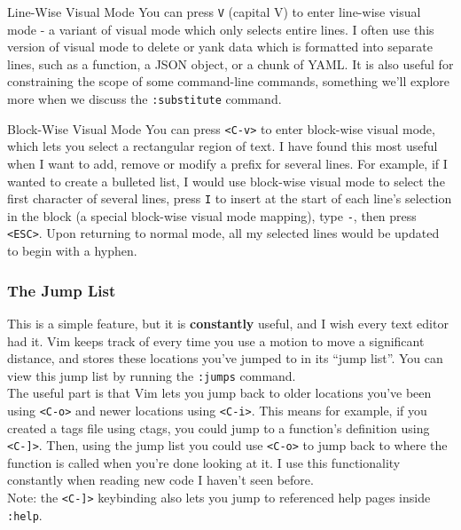 \documentclass{beamer}
\begin{document}
\begin{frame}[fragile]
    \begin{block}{Line-Wise Visual Mode}
	You can press \verb+V+ (capital V) to enter line-wise visual mode - a variant of visual mode which only selects entire lines. I often use this version of visual mode to delete or yank data which is formatted into separate lines, such as a function, a JSON object, or a chunk of YAML. It is also useful for constraining the scope of some command-line commands, something we'll explore more when we discuss the \verb+:substitute+ command.
    \end{block}
    \begin{block}{Block-Wise Visual Mode}
	You can press \verb+<C-v>+ to enter block-wise visual mode, which lets you select a rectangular region of text. I have found this most useful when I want to add, remove or modify a prefix for several lines. For example, if I wanted to create a bulleted list, I would use block-wise visual mode to select the first character of several lines, press \verb+I+ to insert at the start of each line's selection in the block (a special block-wise visual mode mapping), type \verb+-+, then press \verb+<ESC>+. Upon returning to normal mode, all my selected lines would be updated to begin with a hyphen.
    \end{block}
\end{frame}

\begin{frame}[fragile]
    \frametitle{The Jump List}
    This is a simple feature, but it is \textbf{constantly} useful, and I wish every text editor had it. Vim keeps track of every time you use a motion to move a significant distance, and stores these locations you've jumped to in its \enquote{jump list}. You can view this jump list by running the \verb+:jumps+ command.\\
    \vspace{0.5cm}
    The useful part is that Vim lets you jump back to older locations you've been using \verb+<C-o>+ and newer locations using \verb+<C-i>+. This means for example, if you created a tags file using ctags, you could jump to a function's definition using \verb+<C-]>+. Then, using the jump list you could use \verb+<C-o>+ to jump back to where the function is called when you're done looking at it. I use this functionality constantly when reading new code I haven't seen before.\\
    \vspace{0.5cm}
    Note: the \verb+<C-]>+ keybinding also lets you jump to referenced help pages inside \verb+:help+.
\end{frame}
\end{document}
